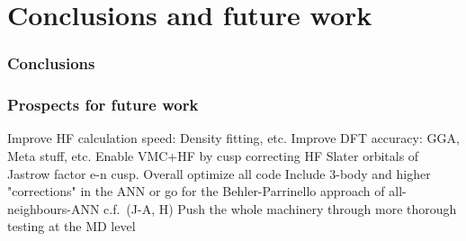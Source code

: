 \documentclass[twoside,english]{uiofysmaster}
\begin{document}
\part{Conclusions and future work}
\section{Conclusions}


\section{Prospects for future work}
Improve HF calculation speed: Density fitting, etc.
Improve DFT accuracy: GGA, Meta stuff, etc. 
Enable VMC+HF by cusp correcting HF Slater orbitals of Jastrow factor e-n cusp.
Overall optimize all code
Include 3-body and higher "corrections" in the ANN or go for the Behler-Parrinello approach of all-neighbours-ANN c.f.\ (J-A, H)
Push the whole machinery through more thorough testing at the MD level 

\begin{appendices}
\appendixpage
\noappendicestocpagenum
\addappheadtotoc

\end{appendices}



\printbibliography
\end{document}
